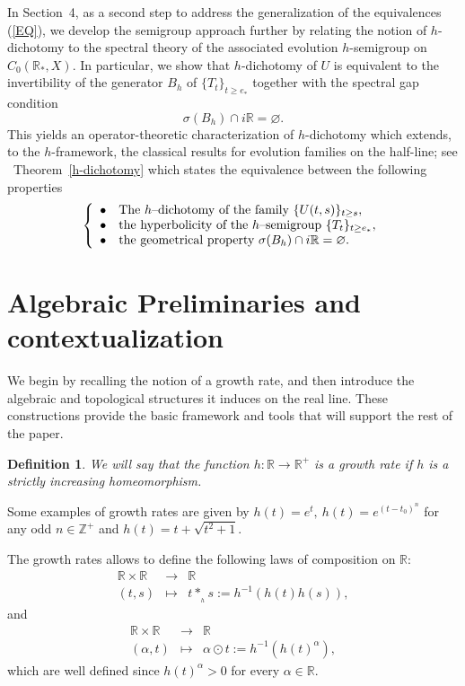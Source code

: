 \documentclass[10pt]{amsart}
\newtheorem{definition}{Definition}
\numberwithin{equation}{section}
\begin{document}
In Section~4, as a second step to address the generalization of the equivalences (\ref{EQ}), we develop the semigroup approach further by relating the notion of
$h$-dichotomy to the spectral theory of the associated evolution $h$-semigroup on
$C_0(\mathbb{R}_*,X)$. In particular, we show that $h$-dichotomy of $U$ is equivalent
to the invertibility of the generator $B_h$ of $\{T_t\}_{t\ge e_*}$ together with the
spectral gap condition
\[
\sigma(B_h)\cap i\mathbb{R}=\varnothing.
\]
This yields an operator-theoretic characterization of $h$-dichotomy which extends, to
the $h$-framework, the classical results for evolution families on the half-line; see \ Theorem~\ref{h-dichotomy}
which states the equivalence between the following properties
\begin{equation*}
\left\{\begin{array}{ll}
\bullet & \textnormal{The $h$--dichotomy of the family $\{U(t,s)\}_{t\geq s}$},\\ 
\bullet & \textnormal{the hyperbolicity of the $h$--semigroup $\{T_{t}\}_{t\geq e_{*}}$},\\
\bullet & \textnormal{the geometrical property $\sigma(B_h)\cap i\mathbb{R}=\varnothing$}.\\
\end{array}\right.
\end{equation*}


\section{Algebraic Preliminaries and contextualization}
We begin by recalling the notion of a growth rate, and then introduce the algebraic
and topological structures it induces on the real line. These constructions provide
the basic framework and tools that will support the rest of the paper.

\begin{definition}
    We will say that the function $h: \mathbb{R} \to \mathbb{R}^+$ is a growth rate if $h$ is a strictly increasing homeomorphism.  
\end{definition}

Some examples of growth rates are given by $h(t)=e^{t},
    \ h(t)=e^{(t-t_{0})^{n}}$ for any odd $n\in \mathbb{Z}^{+}$ and
$h(t)=t+\sqrt{t^2+1}$.

\medskip
The growth rates allows to define the following laws of composition on $\mathbb{R}$:
\begin{equation}
\label{LCI}
\begin{array}{rcl}
\mathbb{R} \times \mathbb{R} & \to &  \mathbb{R}  \\
(t,s) &\mapsto &  t\ast_{_h} s:=h^{-1}\left(h(t)h(s)\right),
\end{array} 
\end{equation}
and
\begin{equation}
\label{LCE}
\begin{array}{rcl}
\mathbb{R} \times \mathbb{R} & \to &  \mathbb{R}  \\
(\alpha,t) &\mapsto &  \alpha \odot t:=h^{-1}\left(h(t)^{\alpha}\right),
\end{array} 
\end{equation}
which are well defined since $h(t)^\alpha>0$ for every $\alpha\in\mathbb R$.
\end{document}

